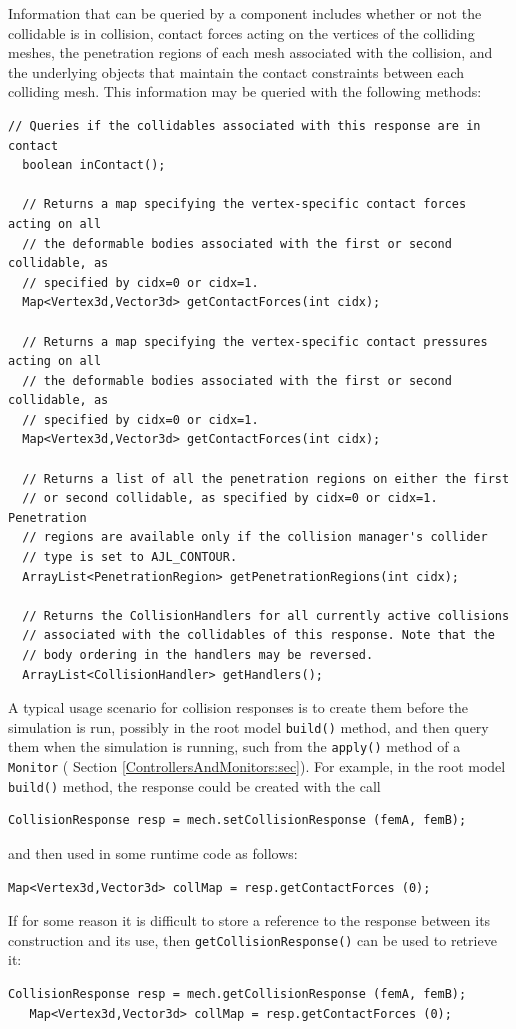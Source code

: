 Information that can be queried by a
 component
includes whether or not the collidable is in collision, contact
forces acting on the vertices of the colliding meshes, the
penetration regions of each mesh associated with the collision, and
the underlying 
objects that maintain the contact constraints between each colliding
mesh. This information may be queried with the following methods:
%
\begin{lstlisting}[]
  // Queries if the collidables associated with this response are in contact
  boolean inContact(); 

  // Returns a map specifying the vertex-specific contact forces acting on all 
  // the deformable bodies associated with the first or second collidable, as 
  // specified by cidx=0 or cidx=1.
  Map<Vertex3d,Vector3d> getContactForces(int cidx);

  // Returns a map specifying the vertex-specific contact pressures acting on all
  // the deformable bodies associated with the first or second collidable, as 
  // specified by cidx=0 or cidx=1.
  Map<Vertex3d,Vector3d> getContactForces(int cidx);

  // Returns a list of all the penetration regions on either the first
  // or second collidable, as specified by cidx=0 or cidx=1. Penetration
  // regions are available only if the collision manager's collider
  // type is set to AJL_CONTOUR.
  ArrayList<PenetrationRegion> getPenetrationRegions(int cidx);

  // Returns the CollisionHandlers for all currently active collisions
  // associated with the collidables of this response. Note that the
  // body ordering in the handlers may be reversed.
  ArrayList<CollisionHandler> getHandlers();
\end{lstlisting}
%

A typical usage scenario for collision responses is to create them
before the simulation is run, possibly in the root model {\tt build()}
method, and then query them when the simulation is running, such from
the {\tt apply()} method of a {\tt Monitor} (
Section \ref{ControllersAndMonitors:sec}). For example,
in the root model {\tt build()} method, the response
could be created with the call
%
\begin{lstlisting}[]
   CollisionResponse resp = mech.setCollisionResponse (femA, femB);
\end{lstlisting}
%
and then used in some runtime code as follows:
%
\begin{lstlisting}[]
   Map<Vertex3d,Vector3d> collMap = resp.getContactForces (0);
\end{lstlisting}
%
If for some reason it is difficult to store a reference to the
response between its construction and its use, then\pdfbreak
{\tt getCollisionResponse()} can be used to retrieve it:
%
\begin{lstlisting}[]
   CollisionResponse resp = mech.getCollisionResponse (femA, femB);
   Map<Vertex3d,Vector3d> collMap = resp.getContactForces (0);
\end{lstlisting}
%

